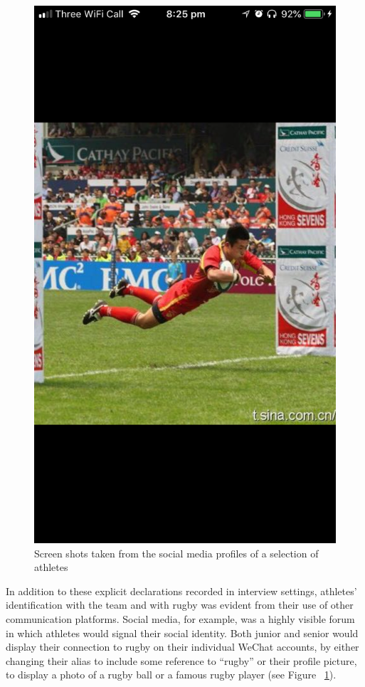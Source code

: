 \begin{CJK}{UTF8}{gbsn}
\begin{figure}[htbp]
\begin{center}
      \includegraphics[scale =.2]{images/bjmWeChatProfile4.png}
      \caption{Screen shots taken from the social media profiles of a selection of athletes}
    \end{center}
      \label{fig:bjmWeChatProfile}
  \end{figure}

In addition to these explicit declarations recorded in interview settings, athletes' identification with the team and with rugby was evident from their use of other communication platforms.  Social media, for example, was a highly visible forum in which athletes would signal their social identity.  Both junior and senior would display their connection to rugby on their individual WeChat accounts, by either changing their alias to include some reference to ``rugby'' or their profile picture, to display a photo of a rugby ball or a famous rugby player (see Figure ~\ref{fig:bjmWeChatProfile}).



\end{CJK}
